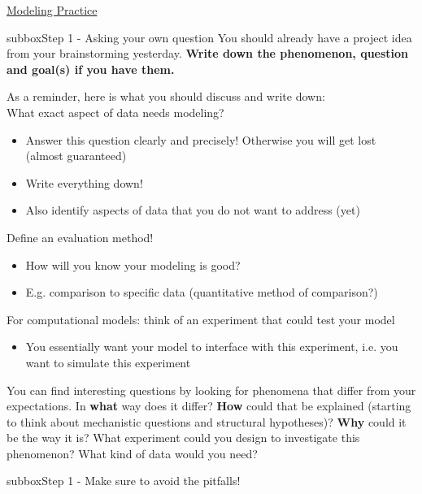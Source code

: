 \begin{textbox}{\href{https://compneuro.neuromatch.io/projects/modelingsteps/ModelingSteps_5through10.html}{Modeling Practice } }

\begin{subbox}{subbox}{Step 1 - Asking your own question }
\scriptsize
You should already have a project idea from your brainstorming yesterday. \textbf{Write down the phenomenon, question and goal(s) if you have them.} 

As a reminder, here is what you should discuss and write down:\\
  What exact aspect of data needs modeling?
  \begin{itemize}
    \item Answer this question clearly and precisely!
Otherwise you will get lost (almost guaranteed)
  \item Write everything down!
  \item  Also identify aspects of data that you do not want to address (yet)
  \end{itemize}
  
Define an evaluation method!
  \begin{itemize}
    \item How will you know your modeling is good?
     \item E.g. comparison to specific data (quantitative method of comparison?)
    \end{itemize}
 For computational models: think of an experiment that could test your model
\begin{itemize}
    \item
   You essentially want your model to interface with this experiment, i.e. you want to simulate this experiment
  
\end{itemize}

You can find interesting questions by looking for phenomena that differ from your expectations. In \textbf{what} way does it differ? \textbf{How} could that be explained (starting to think about mechanistic questions and structural hypotheses)? \textbf{Why} could it be the way it is? What experiment could you design to investigate this phenomenon? What kind of data would you need?

\end{subbox}

\begin{subbox}{subbox}{Step 1 - Make sure to avoid the pitfalls! }
\scriptsize


\end{subbox}
\end{textbox}
